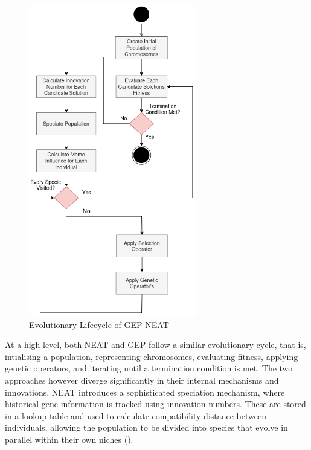 \parbreak
\begin{figure}[H] %
	\centering %
	\includegraphics[width=0.65\textwidth]{Figures/chapter_gep_neat/gep_neat_framework.png} %
	\caption{Evolutionary Lifecycle of GEP-NEAT}
	\label{fig:gep_neat_framework} %
\end{figure}

\parbreak\noindent At a high level, both NEAT and GEP follow a similar evolutionary cycle, that is, intialising a population, representing chromosomes, evaluating fitness, applying genetic operators, and iterating until a termination condition is met. The two approaches however diverge significantly in their internal mechanisms and innovations. NEAT introduces a sophisticated speciation mechanism, where historical gene information is tracked using innovation numbers. These are stored in a lookup table and used to calculate compatibility distance between individuals, allowing the population to be divided into species that evolve in parallel within their own niches (\cite{stanley2002evolving}).

